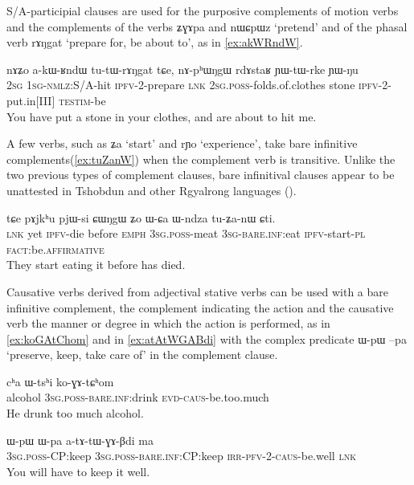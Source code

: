 \documentclass[oldfontcommands,oneside,a4paper,11pt]{article}
\newcommand{\ipa}[1]{{\phon #1}} %
\begin{document}
S/A-participial clauses are used for the purposive complements of motion verbs and the complements of the verbs \ipa{ʑɣɤpa} and \ipa{nɯɕpɯz} `pretend' and of the phasal verb \ipa{rɤŋgat} `prepare for, be about to', as in \ref{ex:akWRndW}.


 \begin{exe}
\ex \label{ex:akWRndW}
\gll
\ipa{nɤʑo}  	\ipa{a-kɯ-ʁndɯ}  	\ipa{tu-tɯ-rɤŋgat}  	\ipa{tɕe,}  	\ipa{nɤ-pʰɯŋgɯ}  	\ipa{rdɤstaʁ}  	\ipa{ɲɯ-tɯ-rke}  	\ipa{ɲɯ-ŋu}  \\
\textsc{2sg} \textsc{1sg-nmlz}:S/A-hit \textsc{ipfv}-2-prepare \textsc{lnk} \textsc{2sg.poss}-folds.of.clothes stone \textsc{ipfv}-2-put.in[III] \textsc{testim}-be \\
\glt You have put a stone in your clothes, and are about to hit me.
\end{exe}

A few verbs, such as \ipa{ʑa} `start' and \ipa{rɲo} `experience', take bare infinitive complements(\ref{ex:tuZanW}) when the complement verb is transitive. Unlike the two previous types of complement clauses, bare infinitival clauses appear to be unattested in Tshobdun and other Rgyalrong languages (\citealt{sun12complementation}).

 \begin{exe}
\ex \label{ex:tuZanW}
\gll
\ipa{tɕe}  	\ipa{pɤjkʰu}  	\ipa{pjɯ-si}  	\ipa{ɕɯŋgɯ}  	\ipa{ʑo}  	\ipa{ɯ-ɕa}  	\ipa{ɯ-ndza}  	\ipa{tu-ʑa-nɯ}  	\ipa{ɕti.}  \\
\textsc{lnk} yet \textsc{ipfv}-die before \textsc{emph} \textsc{3sg.poss}-meat \textsc{3sg-bare.inf}:eat \textsc{ipfv}-start-\textsc{pl} \textsc{fact}:be.\textsc{affirmative} \\
 \glt They start eating it before has died.
\end{exe}

Causative verbs derived from adjectival stative verbs can be used with a bare infinitive complement, the complement indicating the action and the causative verb the manner or degree in which the action is performed, as in \ref{ex:koGAtChom} and in \ref{ex:atAtWGABdi} with the complex predicate \ipa{ɯ-pɯ} \ipa{--pa} `preserve, keep, take care of' in the complement clause.

 \begin{exe}
\ex \label{ex:koGAtChom}
\gll
\ipa{cʰa} \ipa{ɯ-tsʰi} \ipa{ko-ɣɤ-tɕʰom} \\
alcohol \textsc{3sg.poss}-\textsc{bare.inf}:drink \textsc{evd-caus}-be.too.much \\
\glt He drunk too much alcohol.
\end{exe}
 \begin{exe}
\ex \label{ex:atAtWGABdi}
\gll
\ipa{ɯ-pɯ}  	\ipa{ɯ-pa}  	\ipa{a-tɤ-tɯ-ɣɤ-βdi}  	\ipa{ma}  \\
\textsc{3sg.poss}-CP:keep \textsc{3sg.poss}-\textsc{bare.inf}:CP:keep \textsc{irr-pfv-2-caus}-be.well \textsc{lnk} \\
\glt You will have to keep it well.
\end{exe}
\end{document}
